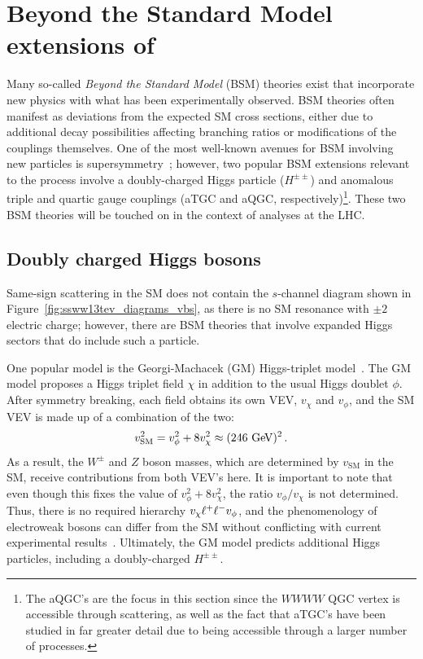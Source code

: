 \section{Beyond the Standard Model extensions of \ssww}\label{ssww13tev:extensions}
Many so-called \emph{Beyond the Standard Model} (BSM) theories exist that incorporate new physics with what has been experimentally observed.
BSM theories often manifest as deviations from the expected SM cross sections, either due to additional decay possibilities affecting branching ratios or modifications of the couplings themselves.
One of the most well-known avenues for BSM involving new particles is supersymmetry~\cite{1997.susy-primer}; however, two popular BSM extensions relevant to the \ssww process involve a doubly-charged Higgs particle ($H^{\pm\pm}$) and anomalous triple and quartic gauge couplings (aTGC and aQGC, respectively)\footnote{The aQGC's are the focus in this section since the $WWWW$ QGC vertex is accessible through \sswwnojj scattering, as well as the fact that aTGC's have been studied in far greater detail due to being accessible through a larger number of processes.}.
These two BSM theories will be touched on in the context of \ssww analyses at the LHC.

\subsection{Doubly charged Higgs bosons}\label{ssww13tev:hpp}
Same-sign \sswwnojj scattering in the SM does not contain the $s$-channel diagram shown in Figure~\ref{fig:ssww13tev_diagrams_vbs}, as there is no SM resonance with $\pm 2$ electric charge; however, there are BSM theories that involve expanded Higgs sectors that do include such a particle.

One popular model is the Georgi-Machacek (GM) Higgs-triplet model~\cite{1985.doubly-charged-higgs}. 
The GM model proposes a Higgs triplet field $\chi$ in addition to the usual Higgs doublet $\phi$.
After symmetry breaking, each field obtains its own VEV, $v_\chi$ and $v_\phi$, and the SM VEV is made up of a combination of the two:
\begin{equation}
  v_{\textrm{SM}}^2 = v_\phi^2+8 v_\chi^2 \approx (246\gev)^2\,.
\end{equation}
As a result, the $W^\pm$ and $Z$ boson masses, which are determined by $v_{\textrm{SM}}$ in the SM, receive contributions from both VEV's here.
It is important to note that even though this fixes the value of $v_\phi^2+8 v_\chi^2$, the ratio $v_\phi/v_\chi$ is not determined.
Thus, there is no required hierarchy $v_\chi \muchless v_\phi$, and the phenomenology of electroweak bosons can differ from the SM without conflicting with current experimental results~\cite{2013.triplet-higgs-lhc}.
Ultimately, the GM model predicts additional Higgs particles, including a doubly-charged $H^{\pm\pm}$.


